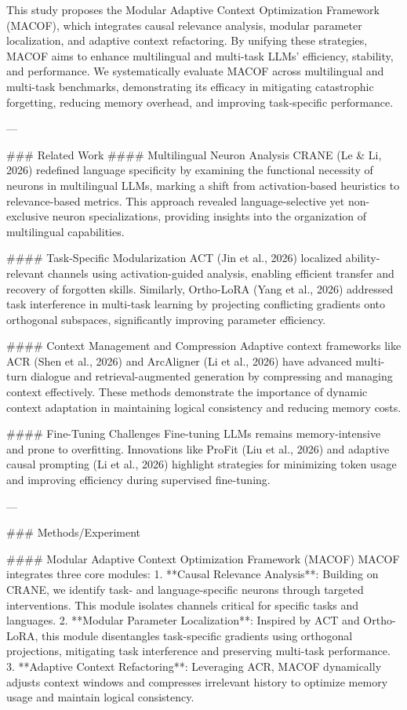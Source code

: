 This study proposes the Modular Adaptive Context Optimization Framework (MACOF), which integrates causal relevance analysis, modular parameter localization, and adaptive context refactoring. By unifying these strategies, MACOF aims to enhance multilingual and multi-task LLMs' efficiency, stability, and performance. We systematically evaluate MACOF across multilingual and multi-task benchmarks, demonstrating its efficacy in mitigating catastrophic forgetting, reducing memory overhead, and improving task-specific performance.

---

### Related Work
#### Multilingual Neuron Analysis
CRANE (Le & Li, 2026) redefined language specificity by examining the functional necessity of neurons in multilingual LLMs, marking a shift from activation-based heuristics to relevance-based metrics. This approach revealed language-selective yet non-exclusive neuron specializations, providing insights into the organization of multilingual capabilities.

#### Task-Specific Modularization
ACT (Jin et al., 2026) localized ability-relevant channels using activation-guided analysis, enabling efficient transfer and recovery of forgotten skills. Similarly, Ortho-LoRA (Yang et al., 2026) addressed task interference in multi-task learning by projecting conflicting gradients onto orthogonal subspaces, significantly improving parameter efficiency.

#### Context Management and Compression
Adaptive context frameworks like ACR (Shen et al., 2026) and ArcAligner (Li et al., 2026) have advanced multi-turn dialogue and retrieval-augmented generation by compressing and managing context effectively. These methods demonstrate the importance of dynamic context adaptation in maintaining logical consistency and reducing memory costs.

#### Fine-Tuning Challenges
Fine-tuning LLMs remains memory-intensive and prone to overfitting. Innovations like ProFit (Liu et al., 2026) and adaptive causal prompting (Li et al., 2026) highlight strategies for minimizing token usage and improving efficiency during supervised fine-tuning.

---

### Methods/Experiment

#### Modular Adaptive Context Optimization Framework (MACOF)
MACOF integrates three core modules:
1. **Causal Relevance Analysis**: Building on CRANE, we identify task- and language-specific neurons through targeted interventions. This module isolates channels critical for specific tasks and languages.
2. **Modular Parameter Localization**: Inspired by ACT and Ortho-LoRA, this module disentangles task-specific gradients using orthogonal projections, mitigating task interference and preserving multi-task performance.
3. **Adaptive Context Refactoring**: Leveraging ACR, MACOF dynamically adjusts context windows and compresses irrelevant history to optimize memory usage and maintain logical consistency.

